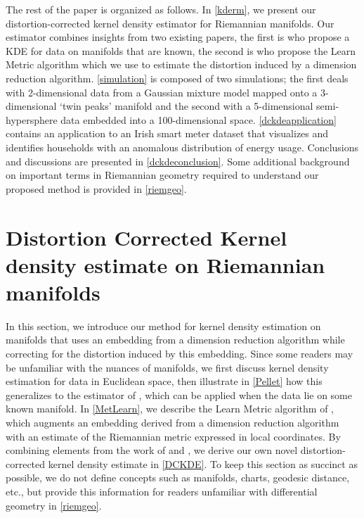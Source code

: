 \documentclass[11pt,a4paper,]{article}
\begin{document}
The rest of the paper is organized as follows. In \autoref{kderm}, we present our distortion-corrected kernel density estimator for Riemannian manifolds. Our estimator combines insights from two existing papers, the first is \textcite{Pelletier2005-vu} who propose a KDE for data on manifolds that are known, the second is \textcite{Perrault-Joncas2013-pq} who propose the Learn Metric algorithm which we use to estimate the distortion induced by a dimension reduction algorithm. \autoref{simulation} is composed of two simulations; the first deals with 2-dimensional data from a Gaussian mixture model mapped onto a 3-dimensional `twin peaks' manifold and the second with a 5-dimensional semi-hypersphere data embedded into a 100-dimensional space. \autoref{dckdeapplication} contains an application to an Irish smart meter dataset that visualizes and identifies households with an anomalous distribution of energy usage. Conclusions and discussions are presented in \autoref{dckdeconclusion}. Some additional background on important terms in Riemannian geometry required to understand our proposed method is provided in \autoref{riemgeo}.

\hypertarget{kderm}{%
\section{Distortion Corrected Kernel density estimate on Riemannian manifolds}\label{kderm}}

In this section, we introduce our method for kernel density estimation on manifolds that uses an embedding from a dimension reduction algorithm while correcting for the distortion induced by this embedding. Since some readers may be unfamiliar with the nuances of manifolds, we first discuss kernel density estimation for data in Euclidean space, then illustrate in \autoref{Pellet} how this generalizes to the estimator of \textcite{Pelletier2005-vu}, which can be applied when the data lie on some known manifold. In \autoref{MetLearn}, we describe the Learn Metric algorithm of \textcite{Perrault-Joncas2013-pq}, which augments an embedding derived from a dimension reduction algorithm with an estimate of the Riemannian metric expressed in local coordinates. By combining elements from the work of \textcite{Pelletier2005-vu} and \textcite{Perrault-Joncas2013-pq}, we derive our own novel distortion-corrected kernel density estimate in \autoref{DCKDE}. To keep this section as succinct as possible, we do not define concepts such as manifolds, charts, geodesic distance, etc., but provide this information for readers unfamiliar with differential geometry in \autoref{riemgeo}.
\end{document}
